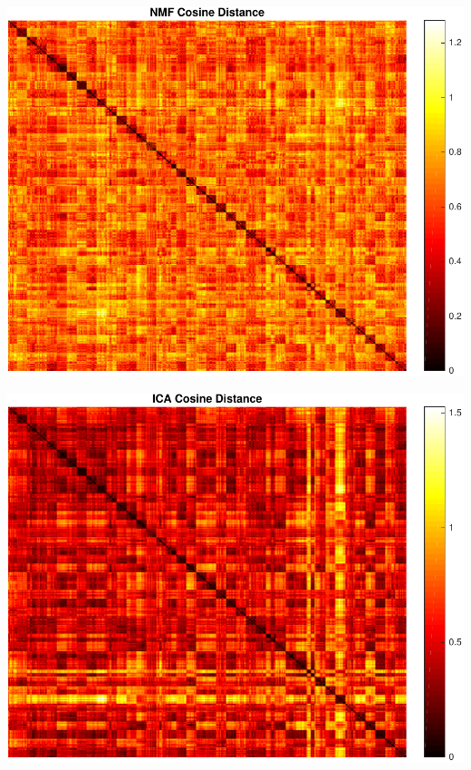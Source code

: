 \begin{center}
\begin{minipage}[t]{\linewidth}
\center
{
\includegraphics[width=\MyFactor\textwidth]{Img/nmfcos} 
}
\end{minipage}
\medskip
\end{center}

\begin{center}
\begin{minipage}[t]{\linewidth}
\center
{
\includegraphics[width=\MyFactor\textwidth]{Img/icacos} 
}
\end{minipage}
\medskip
\end{center}

